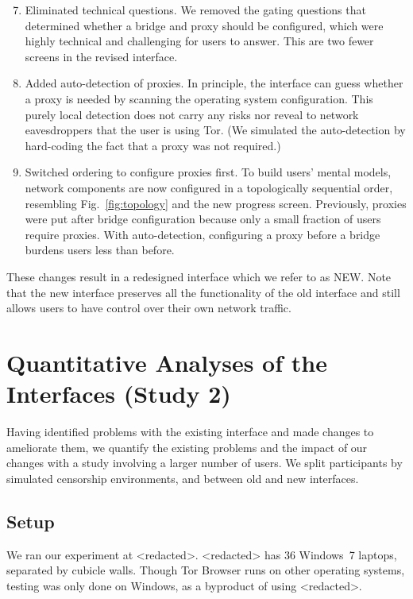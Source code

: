 \documentclass[USenglish,oneside,twocolumn]{article}
\begin{document}
\begin{enumerate}
\setcounter{enumi}{6}
\item Eliminated technical questions.  We removed the gating questions that determined whether a bridge and proxy should be configured, which were highly technical and challenging for users to answer. This are two fewer screens in the revised interface. 
\item Added auto-detection of proxies. In principle, the interface can guess whether a proxy is needed by scanning the operating system configuration. This purely local detection does not carry any risks nor reveal to network eavesdroppers that the user is using Tor. (We simulated the auto-detection by hard-coding the fact that a proxy was not required.)
\item Switched ordering to configure proxies first. To build users' mental models, network components are now configured in a topologically sequential order, resembling Fig.~\ref{fig:topology} and the new progress screen. Previously, proxies were put after bridge configuration because only a small fraction of users require proxies. With auto-detection, configuring a proxy before a bridge burdens users less than before.
\end{enumerate}

These changes result in a redesigned interface which we refer to as NEW. Note that the new interface preserves all the functionality of the old interface and still allows users to have control over their own network traffic. 

\section{Quantitative Analyses of the Interfaces (Study 2)}
\label{sec:quantitative}
Having identified problems with the existing interface
and made changes to ameliorate them,
we quantify the existing problems
and the impact of our changes with a study involving a larger number of users.
We split participants by simulated censorship environments,
and between old and new interfaces.

\subsection{Setup}
We ran our experiment at <redacted>.
<redacted> %
has 36 Windows~7 laptops, separated by cubicle walls. 
Though Tor Browser runs on other operating systems,
testing was only done on Windows, as a byproduct of using <redacted>. %
\end{document}

